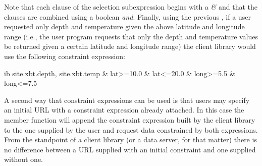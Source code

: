 Note that each clause of the selection subexpression begins with a
\emph{\&\/} and that the clauses are combined using a boolean
\emph{and}.  Finally, using the previous , if a user
requested only depth and temperature given the above latitude and
longitude range (i.e., the user program requests that only the depth
and temperature values be returned given a certain latitude and
longitude range) the client library would use the following constraint
expression:

\begin{vcode}{ib}
site.xbt.depth, site.xbt.temp & lat>=10.0 & lat<=20.0 & 
   long>=5.5 & long<=7.5
\end{vcode}

A second way that constraint expressions can be used is that users may
specify an initial URL with a constraint expression already attached.
In this case the  member function will append the
constraint expression built by the client library to the one supplied
by the user and request data constrained by both expressions.  From
the standpoint of a client library (or a data server, for that matter)
there is no difference between a URL supplied with an initial
constraint and one supplied without one.



